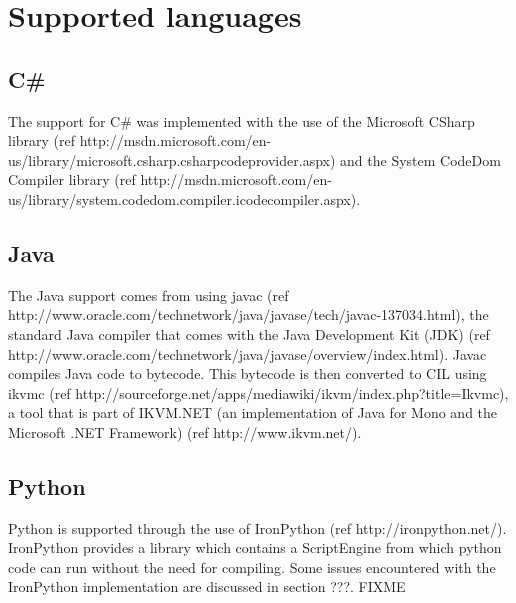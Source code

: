 \section{Supported languages}

\subsection{C\#}
The support for C\# was implemented with the use of the Microsoft CSharp library (ref http://msdn.microsoft.com/en-us/library/microsoft.csharp.csharpcodeprovider.aspx) and the System CodeDom Compiler library (ref http://msdn.microsoft.com/en-us/library/system.codedom.compiler.icodecompiler.aspx).

\subsection{Java}
The Java support comes from using javac (ref http://www.oracle.com/technetwork/java/javase/tech/javac-137034.html), the standard Java compiler that comes with the Java Development Kit (JDK) (ref http://www.oracle.com/technetwork/java/javase/overview/index.html). Javac compiles Java code to bytecode. This bytecode is then converted to CIL using ikvmc (ref http://sourceforge.net/apps/mediawiki/ikvm/index.php?title=Ikvmc), a tool that is part of IKVM.NET (an implementation of Java for Mono and the Microsoft .NET Framework) (ref http://www.ikvm.net/). 

\subsection{Python}
Python is supported through the use of IronPython (ref http://ironpython.net/). IronPython provides a library which contains a ScriptEngine from which python code can run without the need for compiling. Some issues encountered with the IronPython implementation are discussed in section ???. FIXME 